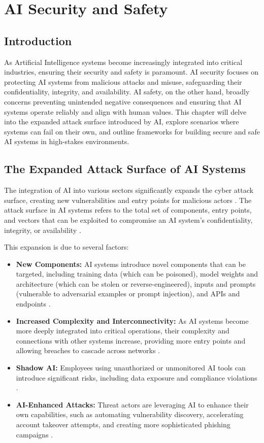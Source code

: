 \chapter{AI Security and Safety}
\label{chap:ai_security_and_safety}

\section{Introduction}
\label{sec:security_introduction}
As Artificial Intelligence systems become increasingly integrated into critical industries, ensuring their security and safety is paramount. AI security focuses on protecting AI systems from malicious attacks and misuse, safeguarding their confidentiality, integrity, and availability. AI safety, on the other hand, broadly concerns preventing unintended negative consequences and ensuring that AI systems operate reliably and align with human values. This chapter will delve into the expanded attack surface introduced by AI, explore scenarios where systems can fail on their own, and outline frameworks for building secure and safe AI systems in high-stakes environments.

\section{The Expanded Attack Surface of AI Systems}
\label{sec:attack_surface}
The integration of AI into various sectors significantly expands the cyber attack surface, creating new vulnerabilities and entry points for malicious actors \parencite{TrendMicro2023}. The attack surface in AI systems refers to the total set of components, entry points, and vectors that can be exploited to compromise an AI system's confidentiality, integrity, or availability \parencite{VerifyWise2023}.

This expansion is due to several factors:
\begin{itemize}
    \item \textbf{New Components:} AI systems introduce novel components that can be targeted, including training data (which can be poisoned), model weights and architecture (which can be stolen or reverse-engineered), inputs and prompts (vulnerable to adversarial examples or prompt injection), and APIs and endpoints \parencite{SentinelOne2025}.
    \item \textbf{Increased Complexity and Interconnectivity:} As AI systems become more deeply integrated into critical operations, their complexity and connections with other systems increase, providing more entry points and allowing breaches to cascade across networks \parencite{JoelAimuemojie2023}.
    \item \textbf{Shadow AI:} Employees using unauthorized or unmonitored AI tools can introduce significant risks, including data exposure and compliance violations \parencite{Wiz2023}.
    \item \textbf{AI-Enhanced Attacks:} Threat actors are leveraging AI to enhance their own capabilities, such as automating vulnerability discovery, accelerating account takeover attempts, and creating more sophisticated phishing campaigns \parencite{TrendMicro2023}.
\end{itemize}

